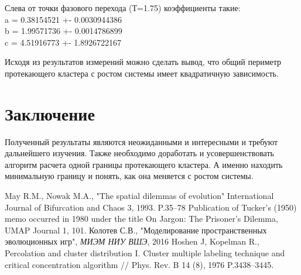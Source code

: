 \documentclass[14pt]{article}
\begin{document}
\par Слева от точки фазового перехода (Т=1.75) коэффициенты такие:\\
a = 0.38154521 +- 0.0030944386\\
b = 1.99571736 +- 0.0014786899\\
c = 4.51916773 +- 1.8926722167\\

\par Исходя из результатов измерений можно сделать вывод, что общий периметр протекающего кластера с ростом системы имеет квадратичную зависимость.

\section{Заключение}
\par Полученный результаты являются неожиданными и интересными и требуют дальнейшего изучения. Также необходимо доработать и усовершенствовать алгоритм расчета одной границы протекающего кластера. А именно находить минимальную границу и понять, как она меняется с ростом системы.\\

\newpage
\begin{thebibliography}{9}
	 May R.M., Nowak M.A., "The spatial dilemmas of evolution" International Journal of Bifurcation and Chaos 3, 1993. P.35–78
	Publication of Tucker's (1950) memo occurred in 1980 under the title On Jargon: The Prisoner's Dilemma, UMAP Journal 1, 101. 
	 Колотев С.В., "Моделирование пространственных эволюционных игр", \textit{МИЭМ НИУ ВШЭ}, 2016
	Hoshen J, Kopelman R., Percolation and cluster distribution I. Cluster multiple labeling technique and critical concentration algorithm // Phys. Rev. B 14 (8), 1976 P.3438–3445.
\end{thebibliography}
\end{document}
